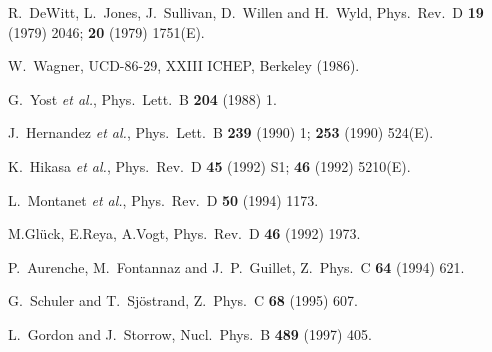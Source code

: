 \documentclass[aps,prl,twocolumn,groupedaddress]{revtex4}
\begin{document}
\begin{thebibliography}{1}
R.~DeWitt, L.~Jones, J.~Sullivan, D.~Willen and H.~Wyld,
Phys.\ Rev.\ D {\bf 19} (1979) 2046; {\bf 20} (1979) 1751(E).

W.~Wagner,
UCD-86-29,
XXIII ICHEP, Berkeley (1986).


G.~Yost {\it et al.},
Phys.\ Lett.\ B {\bf 204} (1988) 1.

J.~Hernandez {\it et al.},
Phys.\ Lett.\ B {\bf 239} (1990) 1; {\bf 253} (1990) 524(E).

K.~Hikasa {\it et al.}, %
Phys.\ Rev.\ D {\bf 45} (1992) S1; {\bf 46} (1992) 5210(E).

L.~Montanet {\it et al.}, %
Phys.\ Rev.\ D {\bf 50} (1994) 1173.


M.Gl\"uck, E.Reya, A.Vogt,
Phys.\ Rev.\ D {\bf 46} (1992) 1973.

P.~Aurenche, M.~Fontannaz and J.~P.~Guillet,
Z.\ Phys.\ C {\bf 64} (1994) 621.

G.~Schuler and T.~Sj\"ostrand,
Z.\ Phys.\ C {\bf 68} (1995) 607.

L.~Gordon and J.~Storrow,
Nucl.\ Phys.\ B {\bf 489} (1997) 405.


\end{thebibliography}
\end{document}
